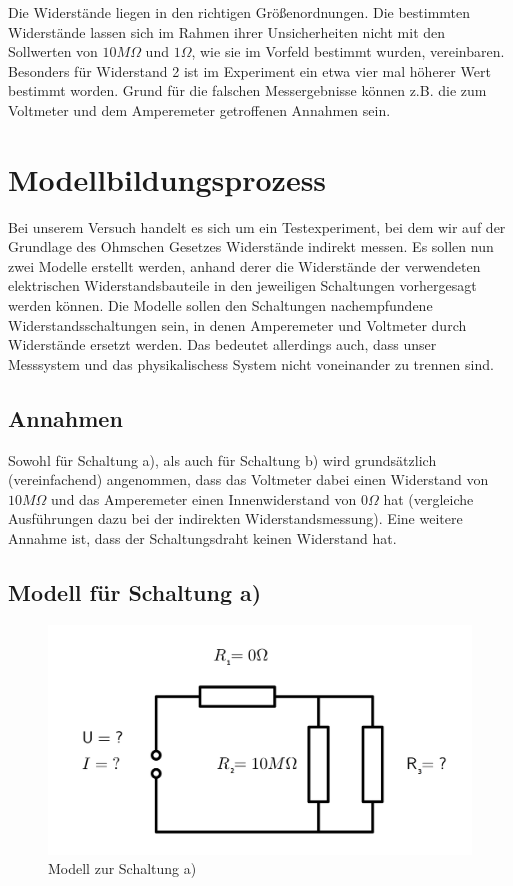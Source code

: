 \documentclass[
  9pt,
]{article}
\begin{document}
Die Widerstände liegen in den richtigen Größenordnungen. Die bestimmten
Widerstände lassen sich im Rahmen ihrer Unsicherheiten nicht mit den
Sollwerten von \(10M\Omega\) und \(1\Omega\), wie sie im Vorfeld
bestimmt wurden, vereinbaren. Besonders für Widerstand 2 ist im
Experiment ein etwa vier mal höherer Wert bestimmt worden. Grund für die
falschen Messergebnisse können z.B. die zum Voltmeter und dem
Amperemeter getroffenen Annahmen sein.

\hypertarget{modellbildungsprozess}{%
\section{Modellbildungsprozess}\label{modellbildungsprozess}}

Bei unserem Versuch handelt es sich um ein Testexperiment, bei dem wir
auf der Grundlage des Ohmschen Gesetzes Widerstände indirekt messen. Es
sollen nun zwei Modelle erstellt werden, anhand derer die Widerstände
der verwendeten elektrischen Widerstandsbauteile in den jeweiligen
Schaltungen vorhergesagt werden können. Die Modelle sollen den
Schaltungen nachempfundene Widerstandsschaltungen sein, in denen
Amperemeter und Voltmeter durch Widerstände ersetzt werden. Das bedeutet
allerdings auch, dass unser Messsystem und das physikalischess System
nicht voneinander zu trennen sind.

\hypertarget{annahmen}{%
\subsection{Annahmen}\label{annahmen}}

Sowohl für Schaltung a), als auch für Schaltung b) wird grundsätzlich
(vereinfachend) angenommen, dass das Voltmeter dabei einen Widerstand
von \(10M\Omega\) und das Amperemeter einen Innenwiderstand von
\(0\Omega\) hat (vergleiche Ausführungen dazu bei der indirekten
Widerstandsmessung). Eine weitere Annahme ist, dass der Schaltungsdraht
keinen Widerstand hat.

\hypertarget{modell-fuxfcr-schaltung-a}{%
\subsection{Modell für Schaltung a)}\label{modell-fuxfcr-schaltung-a}}

\begin{figure}
\centering
\includegraphics[width=\textwidth,height=0.2\textheight]{Bilder/ModellA.png}
\caption{Modell zur Schaltung a)}
\end{figure}
\end{document}
